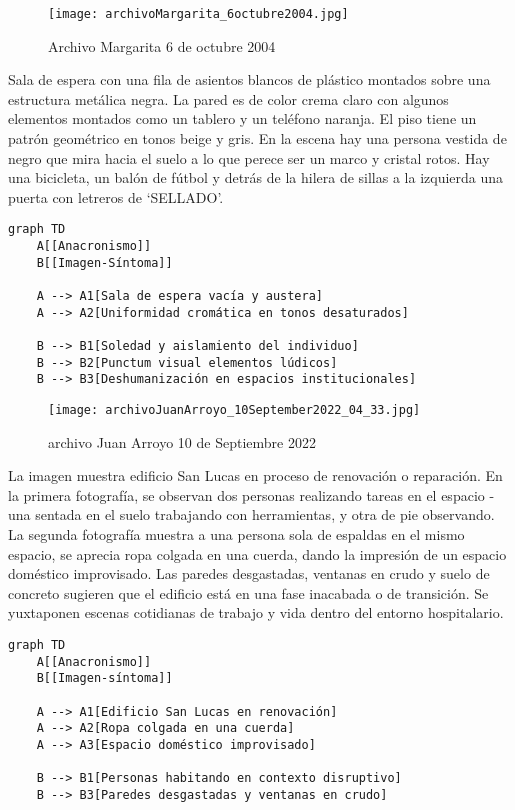 \clearpage
\begin{figure}[h!]
    \centering
    \texttt{[image: archivoMargarita\_6octubre2004.jpg]}
    \caption{Archivo Margarita 6 de octubre 2004}
    \label{fig:archivoMargarita_6octubre2004}
\end{figure}

Sala de espera con una fila de asientos blancos de plástico montados sobre una estructura metálica negra. La pared es de color crema claro con algunos elementos montados como un tablero y un teléfono naranja. El piso tiene un patrón geométrico en tonos beige y gris. En la escena hay una persona vestida de negro que mira hacia el suelo a lo que perece ser un marco y cristal rotos. Hay una bicicleta, un balón de fútbol y detrás de la hilera de sillas a la izquierda una puerta con letreros de `SELLADO'.

\small
\begin{verbatim}
graph TD
    A[[Anacronismo]]
    B[[Imagen-Síntoma]]
    
    A --> A1[Sala de espera vacía y austera]
    A --> A2[Uniformidad cromática en tonos desaturados]
    
    B --> B1[Soledad y aislamiento del individuo]
    B --> B2[Punctum visual elementos lúdicos]
    B --> B3[Deshumanización en espacios institucionales]
\end{verbatim}
\normalsize

\clearpage
\begin{figure}[h!]
    \centering
    \texttt{[image: archivoJuanArroyo\_10September2022\_04\_33.jpg]}
    \caption{archivo Juan Arroyo 10 de Septiembre 2022}
    \label{fig:archivoJuanArroyo_10September2022_04_33}
\end{figure}

La imagen muestra edificio San Lucas en proceso de renovación o reparación. En la primera fotografía, se observan dos personas realizando tareas en el espacio - una sentada en el suelo trabajando con herramientas, y otra de pie observando. La segunda fotografía muestra a una persona sola de espaldas en el mismo espacio, se aprecia ropa colgada en una cuerda, dando la impresión de un espacio doméstico improvisado. Las paredes desgastadas, ventanas en crudo y suelo de concreto sugieren que el edificio está en una fase inacabada o de transición. Se yuxtaponen  escenas cotidianas de trabajo y vida dentro del entorno hospitalario.

\small
\begin{verbatim}
graph TD
    A[[Anacronismo]]
    B[[Imagen-síntoma]]

    A --> A1[Edificio San Lucas en renovación]
    A --> A2[Ropa colgada en una cuerda]
    A --> A3[Espacio doméstico improvisado]

    B --> B1[Personas habitando en contexto disruptivo]
    B --> B3[Paredes desgastadas y ventanas en crudo]
\end{verbatim}
\normalsize

